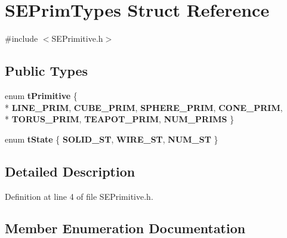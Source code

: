 \section{S\+E\+Prim\+Types Struct Reference}
\label{struct_s_e_prim_types}


{\ttfamily \#include $<$S\+E\+Primitive.\+h$>$}

\subsection*{Public Types}
\begin{DoxyCompactItemize}
\item 
enum {\bf t\+Primitive} \{ \\*
{\bf L\+I\+N\+E\+\_\+\+P\+R\+I\+M}, 
{\bf C\+U\+B\+E\+\_\+\+P\+R\+I\+M}, 
{\bf S\+P\+H\+E\+R\+E\+\_\+\+P\+R\+I\+M}, 
{\bf C\+O\+N\+E\+\_\+\+P\+R\+I\+M}, 
\\*
{\bf T\+O\+R\+U\+S\+\_\+\+P\+R\+I\+M}, 
{\bf T\+E\+A\+P\+O\+T\+\_\+\+P\+R\+I\+M}, 
{\bf N\+U\+M\+\_\+\+P\+R\+I\+M\+S}
 \}
\item 
enum {\bf t\+State} \{ {\bf S\+O\+L\+I\+D\+\_\+\+S\+T}, 
{\bf W\+I\+R\+E\+\_\+\+S\+T}, 
{\bf N\+U\+M\+\_\+\+S\+T}
 \}
\end{DoxyCompactItemize}


\subsection{Detailed Description}


Definition at line 4 of file S\+E\+Primitive.\+h.



\subsection{Member Enumeration Documentation}

